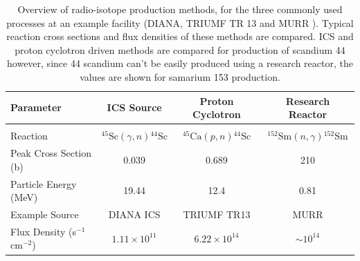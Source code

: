\documentclass[../main.tex]{subfiles}
\begin{document}
\begin{table}[!h]
\centering
\caption{Overview of radio-isotope production methods, for the three commonly used processes at an example facility (DIANA, TRIUMF TR 13 and MURR ). Typical reaction cross sections and flux densities of these methods are compared. ICS and proton cyclotron driven methods are compared for production of scandium 44 however, since 44 scandium can't be easily produced using a research reactor, the values are shown for samarium 153 production.}
\vspace{3mm}
\begin{tabular}{lccc}
\hline\hline
Parameter & ICS Source & Proton Cyclotron & Research Reactor \\
\hline
\multicolumn{4}{c}{\vspace{-4mm}}\\
Reaction & $^{45}\mathrm{Sc}\left(\gamma,n\right){}^{44}\mathrm{Sc}$ & $^{45}\mathrm{Ca}\left(p,n\right){}^{44}\mathrm{Sc}$ & $^{152}\mathrm{Sm}\left(n,\gamma\right){}^{152}\mathrm{Sm}$ \\
Peak Cross Section (\si{\barn}) & 0.039 \cite{veyssiere1974study} & 0.689 \cite{carzaniga2017measurement} & 210 \cite{ma1996production} \\
Particle Energy (\si{\mega\electronvolt}) & 19.44 & 12.4 & 0.81 \\
Example Source & DIANA ICS & TRIUMF TR13 \cite{hoehr2017medical,laxdale1994beam} & MURR \cite{ma1996production} \\
Flux Density (\si{\second}$^{-1}$\si{\centi\meter}$^{-2}$) & $1.11\times 10^{11}$ & $6.22\times 10^{14}$ & $\sim 10^{14}$ \\
\hline\hline
\end{tabular}
\label{tab:example_isotope_cross_section_flux_density}
\end{table}
\end{document}
